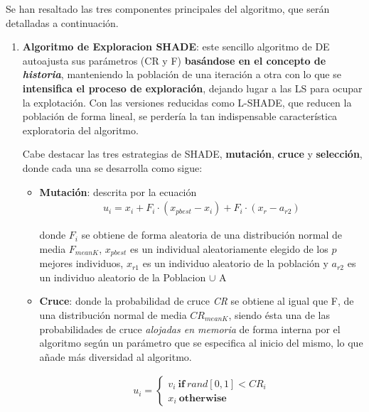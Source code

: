 Se han resaltado las tres componentes principales del algoritmo, que serán detalladas a continuación.

\begin{enumerate}
	\item  \label{algSHADEILS:1} \textbf{Algoritmo de Exploracion SHADE}: este sencillo algoritmo de DE autoajusta sus parámetros (CR y F) \textbf{basándose en el concepto de \textit{historia}}\cite{SHADE}, manteniendo la población de una iteración a otra con lo que se \textbf{intensifica el proceso de exploración}, dejando lugar a las LS para ocupar la explotación. Con las versiones reducidas como L-SHADE, que reducen la población de forma lineal, se perdería la tan indispensable característica exploratoria del algoritmo.
	
	Cabe destacar las tres estrategias de SHADE, \textbf{mutación}, \textbf{cruce} y \textbf{selección}, donde cada una se desarrolla como sigue:
	\begin{itemize}
		\item \textbf{Mutación}: descrita por la ecuación
		\begin{equation}\label{eq:MutationSH}
			\begin{gathered}
				u_i = x_i + F_i \cdot (x_{pbest} - x_i) + F_i \cdot (x_r - a_{r2})
			\end{gathered}
		\end{equation}
		 
		 donde $F_i$ se obtiene de forma aleatoria de una distribución normal de media $F_{meanK}$, $x_{pbest}$ es un individual aleatoriamente elegido de los $p$ mejores individuos, $x_{r1}$ es un individuo aleatorio de la población y $a_{r2}$ es un individuo aleatorio de la Poblacion $\cup$ A
			
		\item \textbf{Cruce}: donde la probabilidad de cruce \textit{CR} se obtiene al igual que F, de una distribución normal de media $CR_{meanK}$, siendo ésta una de las probabilidades de cruce \textit{alojadas en memoria} de forma interna por el algoritmo según un parámetro que se especifica al inicio del mismo, lo que añade más diversidad al algoritmo.
		
		\begin{equation}\label{eq:CrossoverSH}
			\begin{gathered}
				u_i= \begin{cases}
					v_i \ \textbf{if} \ rand[0,1] < CR_i \\
					x_i \ \textbf{otherwise}
				\end{cases}
			\end{gathered}
		\end{equation}
		

\end{itemize}
\end{enumerate}
